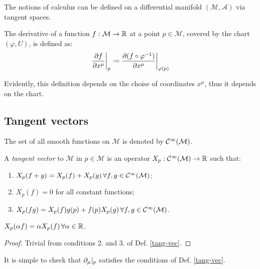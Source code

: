The notions of calculus can be defined on a differential manifold $ (\mathcal{M},\mathcal{A}) $ via tangent spaces.

\begin{definition}
  The derivative of a function $ f : \mathcal{M} \rightarrow \mathbb{R} $ at a point $ p \in \mathcal{M} $, covered by the chart $ (\varphi,U) $, is defined as:
  \begin{equation}
    \frac{\pa f}{\pa x^{\mu}}\bigg\vert_p \defeq \frac{\pa (f \circ \varphi^{-1})}{\pa x^{\mu}}\bigg\vert_{\varphi(p)}
    \label{eq:2.1}
  \end{equation}
\end{definition}

Evidently, this definition depends on the choise of coordinates $ x^{\mu} $, thus it depends on the chart.

\subsection{Tangent vectors}

\begin{definition}
  The set of all smooth functions on $ \mathcal{M} $ is denoted by $ \mathcal{C}^{\infty}(\mathcal{M}) $.
\end{definition}

\begin{definition}\label{tang-vec}
  A \textit{tangent vector} to $ \mathcal{M} $ in $ p \in \mathcal{M} $ is an operator $ X_p : \mathcal{C}^{\infty}(\mathcal{M}) \rightarrow \mathbb{R} $ such that:
  \begin{enumerate}
    \item $ X_p(f + g) = X_p(f) + X_p(g) \,\forall f,g \in\mathcal{C}^{\infty}(\mathcal{M}) $;
    \item $ X_p(f) = 0 $ for all constant functions;
    \item $ X_p(fg) = X_p(f)g(p) + f(p)X_p(g) \,\forall f,g \in\mathcal{C}^{\infty}(\mathcal{M}) $.
  \end{enumerate}
\end{definition}

\begin{proposition}
  $ X_p(\alpha f) = \alpha X_p(f) \,\forall \alpha \in \mathbb{R} $.
\end{proposition}
\begin{proof}
  Trivial from conditions 2. and 3. of Def. \ref{tang-vec}.
\end{proof}

It is simple to check that $ \partial_{\mu}\vert_p $ satisfies the conditions of Def. \ref{tang-vec}.

